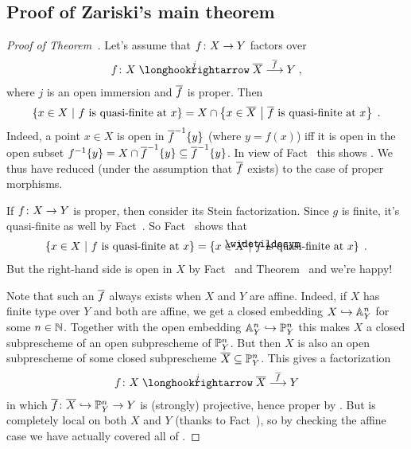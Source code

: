 \documentclass[a4paper,parskip=half,numbers=enddot, DIV=12]{scrreprt}
\begin{document}
\subsection{Proof of Zariski's main theorem}
\label{subsec:discussionOfThm3}
\begin{proof}[Proof of Theorem~]
	Let's assume that $f\colon X\morphism Y$ factors over
	\begin{align}\lbl{eq:properCompactification}
		f\colon X\monomorphism[j]\ov{X}\morphism[\smash{\ov{f}}]Y\;,
	\end{align}
	where $j$ is an open immersion and $\overline{f}$ is proper. Then
	\begin{align}\lbl{eq:fandfbar}
		\left\{x\in X\st f\text{ is quasi-finite at }x\right\}=X\cap \left\{x\in \ov{X}\st \ov{f}\text{ is quasi-finite at }x\right\}\;.
	\end{align}
	Indeed, a point $x\in X$ is open in $\overline{f}^{-1}\{y\}$ (where $y=f(x)$) iff it is open in the open subset $f^{-1}\{y\}=X\cap \overline{f}^{-1}\{y\}\subseteq \overline{f}^{-1}\{y\}$. In view of Fact~ this shows . We thus have reduced  (under the assumption that $\overline{f}$ exists) to the case of proper morphisms. 
	
	If $f\colon X\morphism Y$ is proper, then consider its Stein factorization. Since $g$ is finite, it's quasi-finite as well by Fact~. So Fact~ shows that
	\begin{align*}
		\left\{x\in X\st f\text{ is quasi-finite at }x\right\}=\left\{x\in X\st \snake{f}\text{ is quasi-finite at }x\right\}\;.
	\end{align*}
	But the right-hand side is open in $X$ by Fact~ and Theorem~ and we're happy!
	
	Note that such an $\overline{f}$ always exists when $X$ and $Y$ are affine. Indeed, if $X$ has finite type over $Y$ and both are affine, we get a closed embedding $X\monomorphism\IA_Y^n$ for some $n\in \mathbb{N}$. Together with the open embedding $\IA_Y^n\monomorphism\IP_Y^n$ this makes $X$ a closed subprescheme of an open subprescheme of $\mathbb{P}_Y^n$. But then $X$ is also an open subprescheme of some closed subprescheme $\overline{X}\subseteq \mathbb{P}_Y^n$. This gives a factorization
	\begin{align*}
		f\colon X\monomorphism[j]\ov{X}\morphism[\smash{\ov{f}}]Y
	\end{align*}
	in which $\ov{f}\colon \ov{X}\monomorphism \IP_Y^n\morphism Y$ is (strongly) projective, hence proper by \cite[Proposition~2.4.2]{alggeo2}. But  is completely local on both $X$ and $Y$ (thanks to Fact~), so by checking the affine case we have actually covered all of . 
\end{proof}
\end{document}
